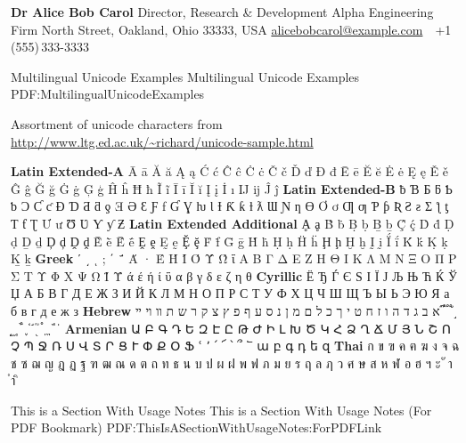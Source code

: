 \documentclass[letterpaper,MMMyyyy,nonstopmode]{simpleresumecv}
\begin{document}
\begin{Body}
\begin{Detail}
\begin{Detail}
\begin{Detail}
\BigGap
\BulletItem
\textbf{Dr Alice Bob Carol}
\newline
Director, Research \& Development
\newline
Alpha Engineering Firm
 North Street, Oakland, Ohio 33333, USA
\newline
\href{mailto:alicebobcarol@example.com}
{alicebobcarol@example.com}
\,\SubBulletSymbol\,
+1\,(555)\,333-3333


\Section
{Multilingual Unicode Examples}
{Multilingual Unicode Examples}
{PDF:MultilingualUnicodeExamples}

\BulletItem
Assortment of unicode characters from
\href{http://www.ltg.ed.ac.uk/~richard/unicode-sample.html}
{\url{http://www.ltg.ed.ac.uk/~richard/unicode-sample.html}}

\begin{Detail}
\Item
\textbf{Latin Extended-A}
Ā ā Ă ă Ą ą Ć ć Ĉ ĉ Ċ ċ Č č Ď ď Đ đ Ē ē Ĕ ĕ Ė ė Ę ę Ě ě Ĝ ĝ Ğ ğ Ġ ġ Ģ ģ Ĥ ĥ Ħ ħ Ĩ ĩ Ī ī Ĭ ĭ Į į İ ı Ĳ ĳ Ĵ ĵ
\textbf{Latin Extended-B}
ƀ Ɓ Ƃ ƃ Ƅ ƅ Ɔ Ƈ ƈ Ɖ Ɗ Ƌ ƌ ƍ Ǝ Ə Ɛ Ƒ ƒ Ɠ Ɣ ƕ Ɩ Ɨ Ƙ ƙ ƚ ƛ Ɯ Ɲ ƞ Ɵ Ơ ơ Ƣ ƣ Ƥ ƥ Ʀ Ƨ ƨ Ʃ ƪ ƫ Ƭ ƭ Ʈ Ư ư Ʊ Ʋ Ƴ ƴ Ƶ
\textbf{Latin Extended Additional}
Ḁ ḁ Ḃ ḃ Ḅ ḅ Ḇ ḇ Ḉ ḉ Ḋ ḋ Ḍ ḍ Ḏ ḏ Ḑ ḑ Ḓ ḓ Ḕ ḕ Ḗ ḗ Ḙ ḙ Ḛ ḛ Ḝ ḝ Ḟ ḟ Ḡ ḡ Ḣ ḣ Ḥ ḥ Ḧ ḧ Ḩ ḩ Ḫ ḫ Ḭ ḭ Ḯ ḯ Ḱ ḱ Ḳ ḳ Ḵ ḵ
\textbf{Greek}
ʹ ͵ ͺ ; ΄ ΅ Ά · Έ Ή Ί Ό Ύ Ώ ΐ Α Β Γ Δ Ε Ζ Η Θ Ι Κ Λ Μ Ν Ξ Ο Π Ρ Σ Τ Υ Φ Χ Ψ Ω Ϊ Ϋ ά έ ή ί ΰ α β γ δ ε ζ η θ
\textbf{Cyrillic}
Ё Ђ Ѓ Є Ѕ І Ї Ј Љ Њ Ћ Ќ Ў Џ А Б В Г Д Е Ж З И Й К Л М Н О П Р С Т У Ф Х Ц Ч Ш Щ Ъ Ы Ь Э Ю Я а б в г д е ж з
\textbf{Hebrew}
א ב ג ד ה ו ז ח ט י ך כ ל ם מ ן נ ס ע ף פ ץ צ ק ר ש ת װ ױ ײ ֝ ֞ ֟ ֠ ֡ ֣ ֤ ֥ ֦ ֧ ֨ ֩ ֪ ֫ ֬ ֭ ֮ ֯ ְ ֱ ֒ ֓ ֔
\textbf{Armenian}
{\UseSecondaryFont
Ա Բ Գ Դ Ե Զ Է Ը Թ Ժ Ի Լ Խ Ծ Կ Հ Ձ Ղ Ճ Մ Յ Ն Շ Ո Չ Պ Ջ Ռ Ս Վ Տ Ր Ց Ւ Փ Ք Օ Ֆ ՙ ՚ ՛ ՜ ՝ ՞ ՟ ա բ գ դ ե զ}
\textbf{Thai}
{\UseSecondaryFont
ก ข ฃ ค ฅ ฆ ง จ ฉ ช ซ ฌ ญ ฎ ฏ ฐ ฑ ฒ ณ ด ต ถ ท ธ น บ ป ผ ฝ พ ฟ ภ ม ย ร ฤ ล ฦ ว ศ ษ ส ห ฬ อ ฮ ฯ ะ ั า ำ ิ}
\end{Detail}

\newpage


\begingroup
\color{red}

\Section
{This is a\newline
Section\newline
With\newline
Usage Notes}
{This is a Section With Usage Notes (For PDF Bookmark)}
{PDF:ThisIsASectionWithUsageNotes:ForPDFLink}


\end{Detail}
\end{Detail}
\end{Detail}
\end{Body}
\end{document}

